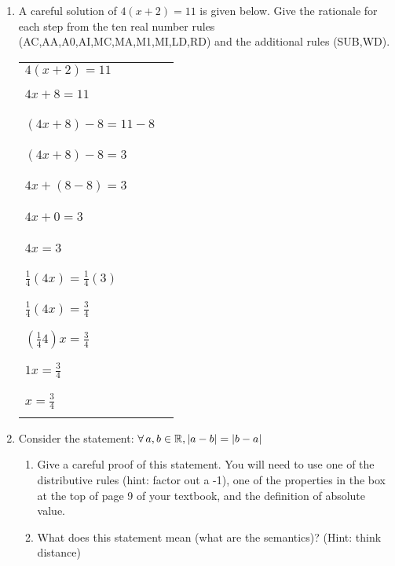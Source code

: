 \documentclass[letterpaper,12pt,fleqn]{article}
\begin{document}
\begin{enumerate}
\item A careful solution of $4(x+2)=11$ is given below. Give the rationale for
each step from the ten real number rules (AC,AA,A0,AI,MC,MA,M1,MI,LD,RD) and
the additional rules (SUB,WD).

\newcommand{\fillin}{\rule{1in}{1pt}}

\begin{tabular}{ll}
$4(x+2)=11$ & \\
$4x+8=11$ & \fillin \\
$(4x+8)-8=11-8$ & \fillin \\
$(4x+8)-8=3$ & \fillin \\
$4x+(8-8)=3$ & \fillin \\
$4x+0=3$ & \fillin \\
$4x=3$ & \fillin \\
$\frac{1}{4}(4x)=\frac{1}{4}(3)$ & \fillin \\
$\frac{1}{4}(4x)=\frac{3}{4}$ & \fillin \\
$(\frac{1}{4}4)x=\frac{3}{4}$ & \fillin \\
$1x=\frac{3}{4}$ & \fillin \\
$x=\frac{3}{4}$ & \fillin \\
\end{tabular}

\bigskip

\item Consider the statement: $\forall\,a,b\in\mathbb{R},|a-b|=|b-a|$
  \begin{enumerate}
  \item Give a careful proof of this statement. You will need to use one of
    the distributive rules (hint: factor out a -1), one of the properties in
    the box at the top of page 9 of your textbook, and the definition of
    absolute value.

  \item What does this statement mean (what are the semantics)? (Hint: think
    distance)
  \end{enumerate}
\end{enumerate}
\end{document}
